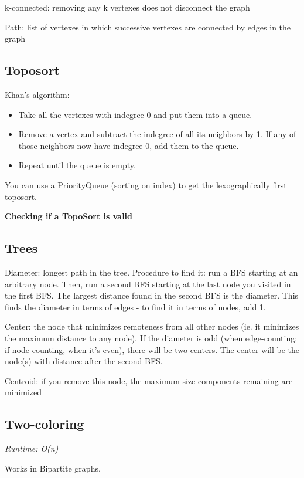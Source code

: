 k-connected: removing any k vertexes does not disconnect the graph

Path: list of vertexes in which successive vertexes are connected by edges in the graph

\subsection*{Toposort}

Khan's algorithm: 
\begin{itemize}
    \item Take all the vertexes with indegree 0 and put them into a queue.
    \item Remove a vertex and subtract the indegree of all its neighbors by 1. If any of those neighbors now have indegree 0, add them to the queue.
    \item Repeat until the queue is empty.
\end{itemize}

You can use a PriorityQueue (sorting on index) to get the lexographically first toposort.

\textbf{Checking if a TopoSort is valid}



\subsection*{Trees}

Diameter: longest path in the tree. Procedure to find it: run a BFS starting at an arbitrary node. Then, run a second BFS starting at the last node you visited in the first BFS. The largest distance found in the second BFS is the diameter. This finds the diameter in terms of edges - to find it in terms of nodes, add 1.

Center: the node that minimizes remoteness from all other nodes (ie. it minimizes the maximum distance to any node). If the diameter is odd (when edge-counting; if node-counting, when it's even), there will be two centers. The center will be the node(s) with distance  after the second BFS.

Centroid: if you remove this node, the maximum size components remaining are minimized

\subsection*{Two-coloring}

\textit{Runtime: O(n)}

Works in Bipartite graphs.




\newpage